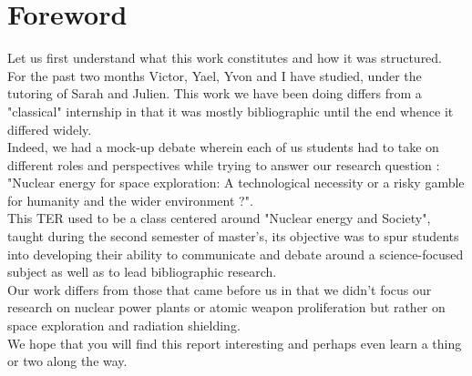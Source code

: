 \chapter*{Foreword}

Let us first understand what this work constitutes and how it was structured.\\


For the past two months Victor, Yael, Yvon and I have studied, under the tutoring of Sarah and Julien.
This work we have been doing differs from a "classical" internship in that it was mostly bibliographic until the end whence it differed widely. \\

Indeed, we had a mock-up debate wherein each of us students had to take on different roles and perspectives while trying to answer our research question : "Nuclear energy for space exploration: A technological necessity or a risky gamble for humanity and the wider environment ?".\\
This TER used to be a class centered around "Nuclear energy and Society", taught during the second semester of master's, its objective was to spur students into developing  their ability to communicate and debate around a science-focused subject as well as to lead bibliographic research.\\

Our work differs from those that came before us in that we didn't focus our research on nuclear power plants or atomic weapon proliferation but rather on space exploration and radiation shielding.\\

We hope that you will find this report interesting and perhaps even learn a thing or two along the way.
\newpage